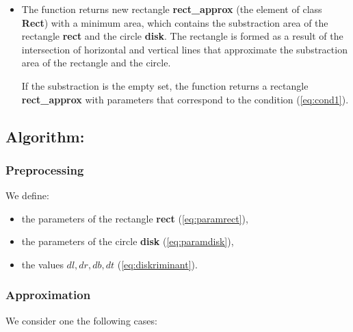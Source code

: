 \documentclass{report}
\begin{document}
\begin{itemize}
	\item The function returns new rectangle {\bfseries rect\_approx} (the element of class {\bfseries Rect}) with a minimum area, which contains the substraction area of the rectangle {\bfseries rect} and the circle {\bfseries disk}. The rectangle is formed as a result of the intersection of horizontal and vertical lines that approximate the substraction area of the rectangle and the circle.
	
	If the substraction is the empty set, the function returns a rectangle {\bfseries rect\_approx} with parameters that correspond to the condition (\ref{eq:cond1}).
	
\end{itemize}

\subsection*{Algorithm:}

\subsubsection*{Preprocessing}

 We define:
 
 \begin{itemize}
 	
 	\item the parameters of the rectangle {\bfseries rect} (\ref{eq:paramrect}),
 	
 	\item the parameters of the circle {\bfseries disk} (\ref{eq:paramdisk}),
 	
 	\item the values $dl, dr, db, dt$ (\ref{eq:diskriminant}).
 		
 \end{itemize}

\subsubsection*{Approximation}

We consider one the following cases:
\end{document}

